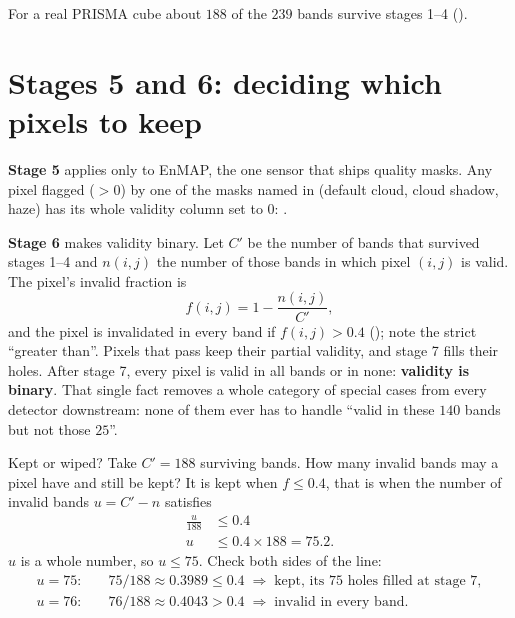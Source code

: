 For a real PRISMA cube about $188$ of the $239$ bands survive stages 1--4
().

\section{Stages 5 and 6: deciding which pixels to keep}\label{sec:bandpipeline:pixels}

\textbf{Stage 5} applies only to EnMAP, the one sensor that ships quality masks. Any pixel flagged
($>0$) by one of the masks named in  (default cloud, cloud shadow,
haze) has its whole validity column set to $0$: .

\textbf{Stage 6} makes validity binary. Let $C'$ be the number of bands that survived stages 1--4
and $n(i,j)$ the number of those bands in which pixel $(i,j)$ is valid. The pixel's invalid
fraction is
\begin{equation}\label{eq:bandpipeline:frac}
f(i,j) = 1 - \frac{n(i,j)}{C'},
\end{equation}
and the pixel is invalidated in every band if $f(i,j) > 0.4$
(); note the strict ``greater than''. Pixels that pass keep their
partial validity, and stage 7 fills their holes. After stage 7, every pixel is valid in all bands or
in none: \textbf{validity is binary}. That single fact removes a whole category of special cases from
every detector downstream: none of them ever has to handle ``valid in these $140$ bands but not
those $25$''.

\begin{worked}[label={we:bandpipeline:frac}]{Kept or wiped?}
Take $C' = 188$ surviving bands. How many invalid bands may a pixel have and still be kept? It is
kept when $f \le 0.4$, that is when the number of invalid bands $u = C' - n$ satisfies
\begin{align*}
\frac{u}{188} &\le 0.4\\
u &\le 0.4 \times 188 = 75.2.
\end{align*}
$u$ is a whole number, so $u \le 75$. Check both sides of the line:
\begin{align*}
u = 75:&\quad 75/188 \approx 0.3989 \le 0.4 \;\Rightarrow\; \text{kept, its 75 holes filled at stage 7},\\
u = 76:&\quad 76/188 \approx 0.4043 > 0.4 \;\Rightarrow\; \text{invalid in every band}.
\end{align*}
\end{worked}

